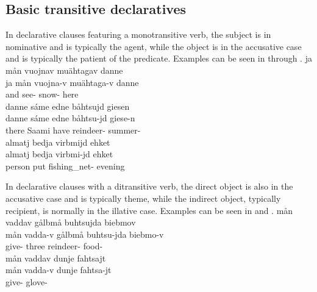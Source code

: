 \subsection{Basic transitive declaratives}\label{basicMonotransDeclaratives}
In declarative clauses featuring a monotransitive verb, %
the subject is in nominative and is typically the agent, while the object is in the accusative case and is typically the patient of the predicate. Examples can be seen in  through . 
\ea\label{basicMonotransDeclaratives1}
\glll	ja mån vuojnav muähtagav danne\\
	ja mån vuojna-v muähtaga-v danne\\
	and  see- snow- here\\\nopagebreak
{} 
\z
\ea\label{basicMonotransDeclaratives2}%
\glll	danne sáme edne båhtsujd giesen\\
	danne sáme edne båhtsu-jd giese-n\\
	there Saami\BS{} have\BS{} reindeer- summer- \\\nopagebreak
{} 
\z
\ea\label{basicMonotransDeclaratives3}
\glll	almatj bedja virbmijd ehket\\
	almatj bedja virbmi-jd ehket\\
	person\BS{} put\BS{} fishing\_net- evening\\%
{} 
\z

In declarative clauses with a ditransitive verb, the direct object is also in the accusative case and is typically theme, while the indirect object, typically recipient, is normally in the illative case. Examples can be seen in  and . 
\ea\label{basicDitransDeclaratives1}
\glll	mån vaddav gålbmå buhtsujda biebmov\\
	mån vadda-v gålbmå buhtsu-jda biebmo-v\\
	 give- three reindeer- food-\\\nopagebreak
{} 
\z
\ea\label{basicDitransDeclaratives2}%
\glll	mån vaddav dunje fahtsajt\\
	mån vadda-v dunje fahtsa-jt\\
	 give-  glove- \\\nopagebreak
{} 
\z


